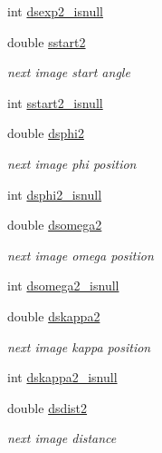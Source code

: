 \begin{DoxyCompactItemize}
int \hyperlink{structlspg__nextshot__struct_a45091283dc073e5b7da2cfbe5a75fade}{dsexp2\_\-isnull}
\item 
double \hyperlink{structlspg__nextshot__struct_a8445cbd2206dc6d62b6bd433f5218c98}{sstart2}
\begin{DoxyCompactList}\small\item\em next image start angle \item\end{DoxyCompactList}\item 
int \hyperlink{structlspg__nextshot__struct_a240c8532d5ce48dbc872d5123a4e721c}{sstart2\_\-isnull}
\item 
double \hyperlink{structlspg__nextshot__struct_a98857616b6bbb6ba861e96b6b7551756}{dsphi2}
\begin{DoxyCompactList}\small\item\em next image phi position \item\end{DoxyCompactList}\item 
int \hyperlink{structlspg__nextshot__struct_a57a9c43be86188f65b96d59c2adec674}{dsphi2\_\-isnull}
\item 
double \hyperlink{structlspg__nextshot__struct_a84ae35abfa725d1bdbff5403f6384ee4}{dsomega2}
\begin{DoxyCompactList}\small\item\em next image omega position \item\end{DoxyCompactList}\item 
int \hyperlink{structlspg__nextshot__struct_afaf9bdf89a68e7f479969072643e55eb}{dsomega2\_\-isnull}
\item 
double \hyperlink{structlspg__nextshot__struct_a8571a0b95fb6ea6356fd7204b9c9e371}{dskappa2}
\begin{DoxyCompactList}\small\item\em next image kappa position \item\end{DoxyCompactList}\item 
int \hyperlink{structlspg__nextshot__struct_a9a7e47372f4f6e0e48a0cb3c78fa8437}{dskappa2\_\-isnull}
\item 
double \hyperlink{structlspg__nextshot__struct_a516827749068577217b27860a01e6041}{dsdist2}
\begin{DoxyCompactList}\small\item\em next image distance \item\end{DoxyCompactList}\item 

\end{DoxyCompactItemize}
